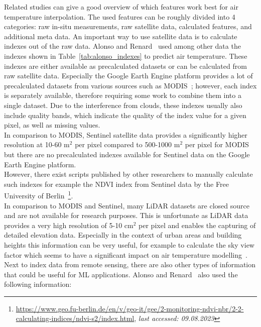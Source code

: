 Related studies can give a good overview of which features work best for air temperature interpolation. The used features can be roughly divided into 4 categories: raw in-situ measurements, raw satellite data, calculated features, and additional meta data. An important way to use satellite data is to calculate indexes out of the raw data. Alonso and Renard~\cite{alonso2020new} used among other data the indexes shown in Table~\ref{tab:alonso_indexes} to predict air temperature. These indexes are either available as precalculated datasets or can be calculated from raw satellite data. Especially the Google Earth Engine platform provides a lot of precalculated datasets from various sources such as MODIS~\cite{didan2021modis}; however, each index is separately available, therefore requiring some work to combine them into a single dataset. Due to the interference from clouds, these indexes usually also include quality bands, which indicate the quality of the index value for a given pixel, as well as missing values.\\
In comparison to MODIS, Sentinel satellite data provides a significantly higher resolution at 10-60 m$^2$ per pixel compared to 500-1000 m$^2$ per pixel for MODIS but there are no precalculated indexes available for Sentinel data on the Google Earth Engine platform.\\
However, there exist scripts published by other researchers to manually calculate such indexes for example the NDVI index from Sentinel data by the Free University of Berlin~\footnote{\url{https://www.geo.fu-berlin.de/en/v/geo-it/gee/2-monitoring-ndvi-nbr/2-2-calculating-indices/ndvi-s2/index.html}, \textit{last accessed: 09.08.2023}}.\\
In comparison to MODIS and Sentinel, many LiDAR datasets are closed source and are not available for research purposes. This is unfortunate as LiDAR data provides a very high resolution of 5-10 cm$^2$ per pixel and enables the capturing of detailed elevation data. Especially in the context of urban areas and building heights this information can be very useful, for example to calculate the sky view factor which seems to have a significant impact on air temperature modelling~\cite{dirksen2019sky}.\\
Next to index data from remote sensing, there are also other types of information that could be useful for ML applications. Alonso and Renard~\cite{alonso2020new} also used the following information:

